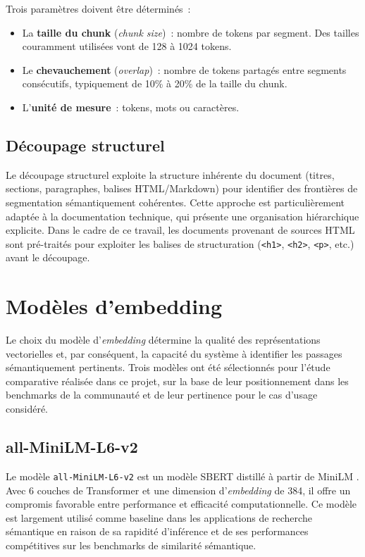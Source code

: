 \documentclass[12pt,a4paper,oneside]{report}
\begin{document}
Trois paramètres doivent être déterminés~:
\begin{itemize}[nosep]
  \item La \textbf{taille du chunk} (\textit{chunk size})~: nombre de tokens par segment. Des tailles couramment utilisées vont de 128 à 1024 tokens.
  \item Le \textbf{chevauchement} (\textit{overlap})~: nombre de tokens partagés entre segments consécutifs, typiquement de 10\% à 20\% de la taille du chunk.
  \item L'\textbf{unité de mesure}~: tokens, mots ou caractères.
\end{itemize}

\subsection{Découpage structurel}

Le découpage structurel exploite la structure inhérente du document (titres, sections, paragraphes, balises HTML/Markdown) pour identifier des frontières de segmentation sémantiquement cohérentes. Cette approche est particulièrement adaptée à la documentation technique, qui présente une organisation hiérarchique explicite. Dans le cadre de ce travail, les documents provenant de sources HTML sont pré-traités pour exploiter les balises de structuration (\texttt{<h1>}, \texttt{<h2>}, \texttt{<p>}, etc.) avant le découpage.

\section{Modèles d'embedding}
\label{sec:embedding_models}

Le choix du modèle d'\textit{embedding} détermine la qualité des représentations vectorielles et, par conséquent, la capacité du système à identifier les passages sémantiquement pertinents. Trois modèles ont été sélectionnés pour l'étude comparative réalisée dans ce projet, sur la base de leur positionnement dans les benchmarks de la communauté et de leur pertinence pour le cas d'usage considéré.

\subsection{all-MiniLM-L6-v2}

Le modèle \texttt{all-MiniLM-L6-v2} \citep{reimers2019} est un modèle SBERT distillé à partir de MiniLM \citep{wang2020minilm}. Avec 6 couches de Transformer et une dimension d'\textit{embedding} de 384, il offre un compromis favorable entre performance et efficacité computationnelle. Ce modèle est largement utilisé comme baseline dans les applications de recherche sémantique en raison de sa rapidité d'inférence et de ses performances compétitives sur les benchmarks de similarité sémantique.
\end{document}
